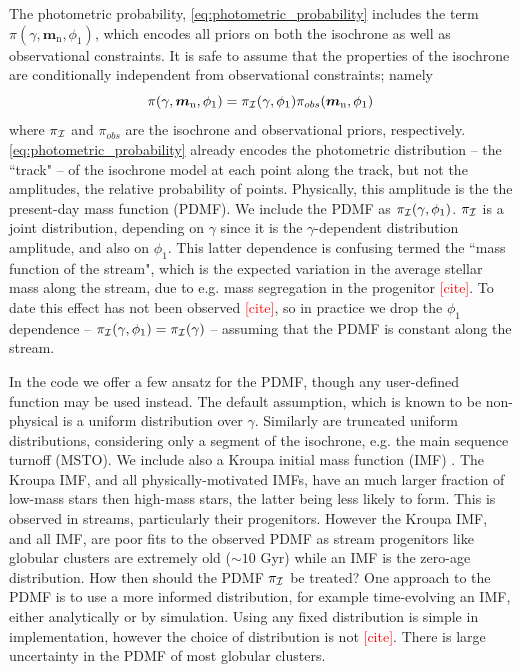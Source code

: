 \documentclass[twocolumn]{aastex631}
\newcommand{\mrm}[1]{\mathrm{#1}}
\newcommand{\mbs}[1]{\boldsymbol{#1}}
\newcommand{\mcal}[1]{\mathcal{#1}}
\newcommand{\prior}{\mcal{\pi}}
\newcommand{\nth}[1]{{#1}_{\mrm{n}}}  %
\newcommand{\TODO}[1]{{\textcolor{red}{#1}}}
\begin{document}
            The photometric probability, \autoref{eq:photometric_probability} includes the term $\prior(\gamma, \nth{\mbs{m}}, \phi_1)$, which encodes all priors on both the isochrone as well as observational constraints. It is safe to assume that the properties of the isochrone are conditionally independent from observational constraints; namely
            \begin{equation} \label{eq:isochrone_prior_components}
                \prior(\gamma, \nth{\mbs{m}}, \phi_1) = \prior_{\cal{I}}(\gamma, \phi_1) \prior_{obs}(\nth{\mbs{m}}, \phi_1)
            \end{equation}
            where $\prior_{\cal{I}}$ and $\prior_{obs}$ are the isochrone and observational priors, respectively.
            \autoref{eq:photometric_probability} already encodes the photometric distribution -- the ``track" -- of the isochrone model at each point along the track, but not the amplitudes, the relative probability of points. Physically, this amplitude is the the present-day mass function (PDMF). We include the PDMF as $\prior_{\cal{I}}(\gamma, \phi_1)$. $\prior_{\cal{I}}$ is a joint distribution, depending on $\gamma$ since it is the $\gamma$-dependent distribution amplitude, and also on $\phi_1$. This latter dependence is confusing termed the ``mass function of the stream", which is the expected variation in the average stellar mass along the stream, due to e.g. mass segregation in the progenitor \TODO{[cite]}. To date this effect has not been observed \TODO{[cite]}, so in practice we drop the $\phi_1$ dependence -- $\prior_{\cal{I}}(\gamma, \phi_1) = \prior_{\cal{I}}(\gamma)$ -- assuming that the PDMF is constant along the stream.

            In the code we offer a few ansatz for the PDMF, though any user-defined function may be used instead. The default assumption, which is known to be non-physical is a uniform distribution over $\gamma$. Similarly are truncated uniform distributions, considering only a segment of the isochrone, e.g. the main sequence turnoff (MSTO). We include also a Kroupa initial mass function (IMF) \citep{2001MNRAS.322..231K}. The Kroupa IMF, and all physically-motivated IMFs,
            have an much larger fraction of low-mass stars then high-mass stars, the latter being less likely to form. This is observed in streams, particularly their progenitors. However the Kroupa IMF, and all IMF, are poor fits to the observed PDMF as stream progenitors like globular clusters are extremely old ($\sim10$ Gyr) while an IMF is the zero-age distribution.
            How then should the PDMF $\prior_{\cal{I}}$ be treated?
            One approach to the PDMF is to use a more informed distribution, for example time-evolving an IMF, either analytically or by simulation.
            Using any fixed distribution is simple in implementation, however the choice of distribution is not \TODO{[cite]}.
            There is large uncertainty in the PDMF of most globular clusters.
            
\end{document}
